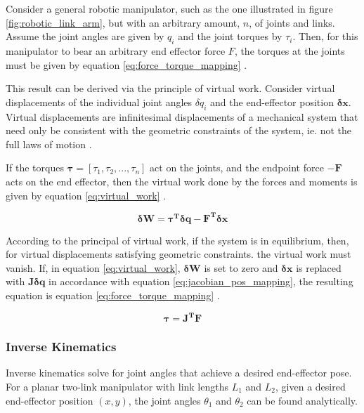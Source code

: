     Consider a general robotic manipulator, such as the one illustrated in figure \ref{fig:robotic_link_arm}, but with an arbitrary amount, $n$, of joints and links. Assume the joint angles are given by $q_i$ and the joint torques by $\tau_i$. Then, for this manipulator to bear an arbitrary end effector force $F$, the torques at the joints must be given by equation \ref{eq:force_torque_mapping} \cite{ASADA_LECTURE_NOTES}.

    This result can be derived via the principle of virtual work. Consider virtual displacements of the individual joint angles $\delta q_i$ and the end-effector position $\mathbf{\delta x}$. Virtual displacements are infinitesimal displacements of a mechanical system that need only be consistent with the geometric constraints of the system, ie. not the full laws of motion \cite{ASADA_LECTURE_NOTES}. 
    
    If the torques $\mathbf{\tau} = [\tau_1, \tau_2, ..., \tau_n]$ act on the joints, and the endpoint force $\mathbf{-F}$ acts on the end effector, then the virtual work done by the forces and moments is given by equation \ref{eq:virtual_work} \cite{ASADA_LECTURE_NOTES}.

    \begin{equation}
        \label{eq:virtual_work}
        \mathbf{\delta W} = \mathbf{\tau^T\delta q -F^T\delta x} 
    \end{equation}

    According to the principal of virtual work, if the system is in equilibrium, then, for virtual displacements satisfying geometric constraints. the virtual work must vanish. If, in equation \ref{eq:virtual_work}, $\mathbf{\delta W}$ is set to zero and $\mathbf{\delta x}$ is replaced with $\mathbf{J}\mathbf{\delta q}$ in accordance with equation \ref{eq:jacobian_pos_mapping}, the resulting equation is equation \ref{eq:force_torque_mapping} \cite{ASADA_LECTURE_NOTES}.

    \begin{equation}
        \label{eq:force_torque_mapping}
        \mathbf{\tau} = \mathbf{J^T F}
    \end{equation}

    \subsubsection{Inverse Kinematics}
    Inverse kinematics solve for joint angles that achieve a desired end-effector pose. For a planar two-link manipulator with link lengths \(L_1\) and \(L_2\), given a desired end-effector position \((x,y)\), the joint angles \(\theta_1\) and \(\theta_2\) can be found analytically.

